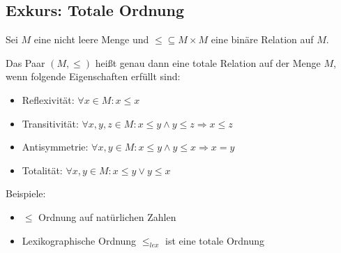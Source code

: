 \documentclass[
    12pt,
    a4paper,
    ngerman,
    color=3b,%
    marginpar=false,
    colorback=false,
    leqno,
]{tudaexercise}
\begin{document}
\subsection{Exkurs: Totale Ordnung}\label{Totale Ordnung}
Sei $M$ eine nicht leere Menge und $\leq \subseteq M\times M $ eine binäre Relation auf $M$.

Das Paar $(M,\leq)$ heißt genau dann eine totale Relation auf der Menge $M$, wenn folgende Eigenschaften erfüllt sind:
\begin{itemize}
    \item Reflexivität: $\forall x \in M: x \leq x$
    \item Transitivität: $\forall x,y,z\in M: x\leq y \land y \leq z \Rightarrow x \leq z$
    \item Antisymmetrie: $\forall x,y\in M: x\leq y \land y \leq x \Rightarrow x = y$
    \item Totalität: $\forall x,y \in M : x\leq y \lor y \leq x$
\end{itemize}
Beispiele:\begin{itemize}
    \item $\leq$ Ordnung auf natürlichen Zahlen
    \item Lexikographische Ordnung $\leq_{lex}$ ist eine totale Ordnung
\end{itemize}
\end{document}

